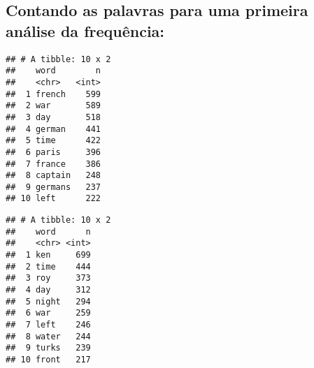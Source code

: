 \documentclass[]{article}
\newenvironment{Shaded}{\begin{snugshade}}{\end{snugshade}}
\newcommand{\DataTypeTok}[1]{\textcolor[rgb]{0.13,0.29,0.53}{#1}}
\newcommand{\DecValTok}[1]{\textcolor[rgb]{0.00,0.00,0.81}{#1}}
\newcommand{\KeywordTok}[1]{\textcolor[rgb]{0.13,0.29,0.53}{\textbf{#1}}}
\newcommand{\NormalTok}[1]{#1}
\newcommand{\OperatorTok}[1]{\textcolor[rgb]{0.81,0.36,0.00}{\textbf{#1}}}
\newcommand{\OtherTok}[1]{\textcolor[rgb]{0.56,0.35,0.01}{#1}}
\newcommand{\StringTok}[1]{\textcolor[rgb]{0.31,0.60,0.02}{#1}}
\begin{document}
\hypertarget{contando-as-palavras-para-uma-primeira-analise-da-frequencia}{%
\subsection{Contando as palavras para uma primeira análise da
frequência:}\label{contando-as-palavras-para-uma-primeira-analise-da-frequencia}}

\begin{Shaded}
\end{Shaded}

\begin{verbatim}
## # A tibble: 10 x 2
##    word        n
##    <chr>   <int>
##  1 french    599
##  2 war       589
##  3 day       518
##  4 german    441
##  5 time      422
##  6 paris     396
##  7 france    386
##  8 captain   248
##  9 germans   237
## 10 left      222
\end{verbatim}

\begin{Shaded}
\end{Shaded}

\begin{verbatim}
## # A tibble: 10 x 2
##    word      n
##    <chr> <int>
##  1 ken     699
##  2 time    444
##  3 roy     373
##  4 day     312
##  5 night   294
##  6 war     259
##  7 left    246
##  8 water   244
##  9 turks   239
## 10 front   217
\end{verbatim}

\begin{Shaded}
\end{Shaded}
\end{document}
